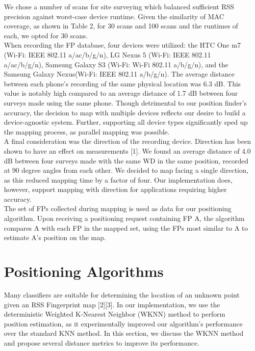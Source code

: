 \documentclass[conference]{IEEEtran}
\begin{document}
\indent We chose a number of scans for site surveying which balanced sufficient RSS precision against worst-case device runtime. Given the similarity of MAC coverage, as shown in Table 2, for 30 scans and 100 scans and the runtimes of each, we opted for 30 scans.\\
\indent When recording the FP database, four devices were utilized: the HTC One m7 (Wi-Fi: IEEE 802.11 a/ac/b/g/n), LG Nexus 5  (Wi-Fi: IEEE 802.11 a/ac/b/g/n), Samsung Galaxy S3 (Wi-Fi: Wi-Fi 802.11 a/b/g/n), and the Samsung Galaxy Nexus(Wi-Fi: IEEE 802.11 a/b/g/n). The average distance between each phone's recording of the same physical location was 6.3 dB. This value is notably high compared to an average distance of 1.7 dB between four surveys made using the same phone. Though detrimental to our position finder's accuracy, the decision to map with multiple devices reflects our desire to build a device-agnostic system. Further, supporting all device types significantly sped up the mapping process, as parallel mapping was possible.\\
\indent A final consideration was the direction of the recording device. Direction has been shown to have an effect on measurements [1]. We found an average distance of 4.0 dB between four surveys made with the same WD in the same position, recorded at 90 degree angles from each other. We decided to map facing a single direction, as this reduced mapping time by a factor of four. Our implementation does, however, support mapping with direction for applications requiring higher accuracy.\\
\indent The set of FPs collected during mapping is used as data for our positioning algorithm. Upon receiving a positioning request containing FP A, the algorithm compares A with each FP in the mapped set, using the FPs most similar to A to estimate A's position on the map.

\section{Positioning Algorithms}
Many classifiers are suitable for determining the location of an unknown point given an RSS Fingerprint map [2][3]. In our implementation, we use the deterministic Weighted K-Nearest Neighbor (WKNN) method to perform position estimation, as it experimentally improved our algorithm's performance over the standard KNN method. In this section, we discuss the WKNN method and propose several distance metrics to improve its performance. 
\end{document}

